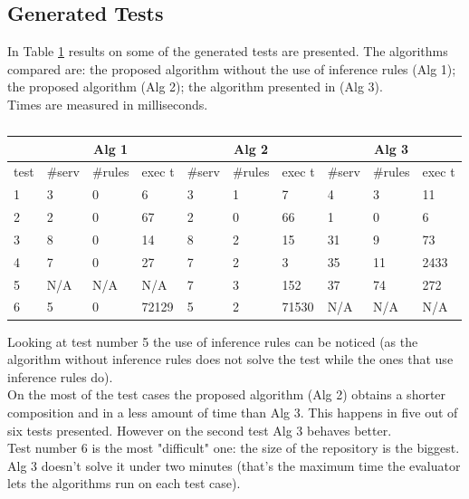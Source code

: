 \documentclass[12pt]{article}
\theoremstyle{definition}
\begin{document}
		\subsection{Generated Tests}
		In Table \ref{table:generated} results on some of the generated tests are presented. The algorithms compared are: the proposed algorithm without the use of inference rules (Alg 1); the proposed algorithm (Alg 2); the algorithm presented in \cite{paulRelational} (Alg 3).\\ Times are measured in milliseconds.\\
		\begin{table}[!h]
			\centering
			\begin{tabular}{|l|l|l|l|l|l|l|l|l|l|}
				\hline
				& \multicolumn{3}{c|}{Alg 1}     & \multicolumn{3}{c|}{Alg 2}     & \multicolumn{3}{c|}{Alg 3}     \\ \hline
				test & \#serv & \#rules & exec t & \#serv & \#rules & exec t & \#serv & \#rules & exec t \\ \hline
				1    & 3       & 0        & 6         & 3       & 1        & 7         & 4       & 3        & 11        \\ \hline
				2    & 2       & 0        & 67        & 2       & 0        & 66        & 1       & 0        & 6         \\ \hline
				3    & 8       & 0        & 14        & 8       & 2        & 15        & 31      & 9        & 73        \\ \hline
				4    & 7       & 0        & 27        & 7       & 2        & 3         & 35      & 11       & 2433      \\ \hline
				5    & N/A     & N/A      & N/A       & 7       & 3        & 152       & 37      & 74       & 272       \\ \hline
				6    & 5       & 0        & 72129     & 5       & 2        & 71530     & N/A     & N/A      & N/A       \\ \hline
			\end{tabular}
		\caption{}
		\label{table:generated}
		\end{table}
		Looking at test number 5 the use of inference rules can be noticed (as the algorithm without inference rules does not solve the test while the ones that use inference rules do). \\
		On the most of the test cases the proposed algorithm (Alg 2) obtains a shorter composition and in a less amount of time than Alg 3. This happens in five out of six tests presented. However on the second test Alg 3 behaves better. \\
		Test number 6 is the most "difficult" one: the size of the repository is the biggest. Alg 3 doesn't solve it under two minutes (that's the maximum time the evaluator lets the algorithms run on each test case). \\
		
\end{document}
